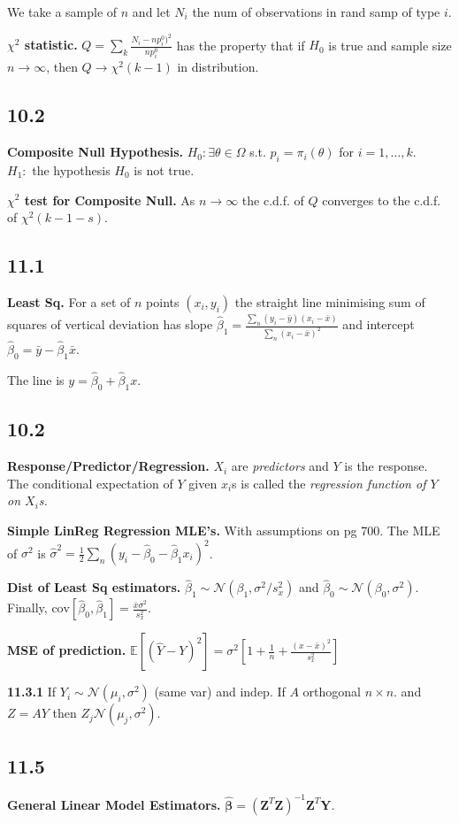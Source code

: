 \documentclass{article}
\newcommand{\E}[1]{\mathbb{E}\left[#1\right]}
\newcommand{\cov}[1]{\text{cov}\left[#1\right]}
\newcommand{\cdf}{c.d.f. }
\newcommand{\norm}[2]{\mathcal{N}(#1, #2)}
\begin{document}
We take a sample of $n$ and let $N_i$ the num of observations in rand samp of 
type $i$.

\textbf{$\chi^2$ statistic.}
$Q = \sum_k \frac{N_i - np_i^0)^2}{np_i^0}$ has the property that if $H_0$ is true
and sample size $n\to \infty$, then $Q \rightarrow \chi^2(k-1)$ in distribution.

\subsection*{10.2}
\textbf{Composite Null Hypothesis.}
$H_0: \exists \theta \in \Omega$ s.t. $p_i = \pi_i(\theta)$ for $i = 1,\dots,k.$\\
$H_1:$ the hypothesis $H_0$ is not true.

\textbf{$\chi^2$ test for Composite Null.}
As $n \to \infty$ the \cdf of $Q$ converges to the \cdf of $\chi^2(k - 1 - s)$.

\subsection*{11.1}
\textbf{Least Sq.}
For a set of $n$ points $(x_i, y_i)$ the straight line minimising sum of squares
of vertical deviation has slope
$\hat{\beta}_1 = \frac{\sum_n(y_i-\bar{y})(x_i - \bar{x})}{\sum_n (x_i - \bar{x})^2}$
and intercept
$\hat{\beta}_0 = \bar{y} - \hat{\beta}_1\bar{x}.$

The line is $y = \hat{\beta}_0 + \hat{\beta}_1x$.

\subsection*{10.2}
\textbf{Response/Predictor/Regression.}
$X_i$ are \textit{predictors} and $Y$ is the response. The conditional expectation
of $Y$ given $x_i$s is called the \textit{regression function of $Y$ on $X_i$s.}

\textbf{Simple LinReg Regression MLE's.}
With assumptions on pg 700. The MLE of $\sigma^2$ is 
$\hat{\sigma}^2 = \frac{1}{2}\sum_n(y_i - \hat{\beta}_0 - \hat{\beta}_1x_i)^2$.

\textbf{Dist of Least Sq estimators.}
$\hat{\beta}_1 \sim \norm{\beta_1}{\sigma^2/s_x^2}$ and
$\hat{\beta}_0 \sim \norm{\beta_0}{\sigma^2}$. Finally, 
$\cov{\hat{\beta}_0, \hat{\beta}_1} = \frac{\bar{x}\sigma^2}{s_x^2}$.

\textbf{MSE of prediction.}
$\E{(\hat{Y} - Y)^2} = \sigma^2\left[1 + \frac{1}{n} + \frac{(x - \bar{x})^2}{s_x^2}\right]$

\textbf{11.3.1}
If $Y_i \sim \norm{\mu_i}{\sigma^2}$ (same var) and indep. If $A$ orthogonal
$n \times n$. and $Z = AY$ then $Z_j \norm{\mu_j}{\sigma^2}$.

\subsection*{11.5}
\textbf{General Linear Model Estimators.}
$\bm{\hat{\beta}} = (\bm{Z}^T\bm{Z})^{-1}\bm{Z}^T\bm{Y}.$
\end{document}
